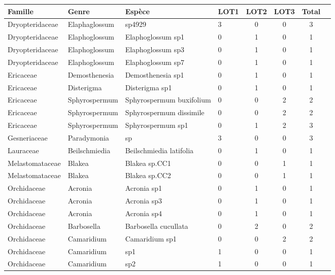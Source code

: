 \documentclass[a4paper,12pt]{article}
\begin{document}
    \begin{table}[H]
    \centering
    \renewcommand{\arraystretch}{1.1}
    \setlength{\tabcolsep}{2pt}
    \scriptsize
    \begin{tabular}{llllcccc}
        \hline
        \textbf{Famille} & \textbf{Genre} & \textbf{Espèce} & \textbf{LOT1} & \textbf{LOT2} & \textbf{LOT3} & \textbf{Total} \\
        \hline

        Dryopteridaceae & Elaphaglossum & sp4929 & 3 & 0 & 0 & 3 \\
        Dryopteridaceae & Elaphoglossum & Elaphoglossum sp1 & 0 & 1 & 0 & 1 \\
        Dryopteridaceae & Elaphoglossum & Elaphoglossum sp3 & 0 & 1 & 0 & 1 \\
        Dryopteridaceae & Elaphoglossum & Elaphoglossum sp7 & 0 & 1 & 0 & 1 \\
        Ericaceae & Demosthenesia & Demosthenesia sp1 & 0 & 1 & 0 & 1 \\
        Ericaceae & Disterigma & Disterigma sp1 & 0 & 1 & 0 & 1 \\
        Ericaceae & Sphyrospermum & Sphyrospermum buxifolium & 0 & 0 & 2 & 2 \\
        Ericaceae & Sphyrospermum & Sphyrospermum dissimile & 0 & 0 & 2 & 2 \\
        Ericaceae & Sphyrospermum & Sphyrospermum sp1 & 0 & 1 & 2 & 3 \\
        Gesneriaceae & Paradymonia & sp & 3 & 0 & 0 & 3 \\
        Lauraceae & Beilschmiedia & Beilschmiedia latifolia & 0 & 1 & 0 & 1 \\
        Melastomataceae & Blakea & Blakea sp.CC1 & 0 & 0 & 1 & 1 \\
        Melastomataceae & Blakea & Blakea sp.CC2 & 0 & 0 & 1 & 1 \\
        Orchidaceae & Acronia & Acronia sp1 & 0 & 1 & 0 & 1 \\
        Orchidaceae & Acronia & Acronia sp3 & 0 & 1 & 0 & 1 \\
        Orchidaceae & Acronia & Acronia sp4 & 0 & 1 & 0 & 1 \\
        Orchidaceae & Barbosella & Barbosella cucullata & 0 & 2 & 0 & 2 \\
        Orchidaceae & Camaridium & Camaridium sp1 & 0 & 0 & 2 & 2 \\
        Orchidaceae & Camaridium & sp1 & 1 & 0 & 0 & 1 \\
        Orchidaceae & Camaridium & sp2 & 1 & 0 & 0 & 1 \\

\end{tabular}
\end{table}
\end{document}
